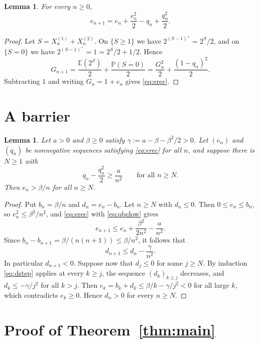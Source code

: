 \documentclass[11pt]{amsart}
\newtheorem{lemma}[theorem]{Lemma}
\theoremstyle{definition}
\theoremstyle{remark}
\numberwithin{equation}{section}
\newcommand{\Pp}{\mathbb P}
\newcommand{\E}{\mathbb E}
\begin{document}
\begin{lemma}\label{lem:rec}
For every $n\ge0$,
\begin{equation}\label{eq:erec}
e_{n+1}=e_n+\frac{e_n^2}{2}-q_n+\frac{q_n^2}{2}.
\end{equation}
\end{lemma}

\begin{proof}
Let $S=X_n^{(1)}+X_n^{(2)}$. On $\{S\ge1\}$ we have $2^{(S-1)^+}=2^{S}/2$, and on $\{S=0\}$ we have $2^{(S-1)^+}=1=2^S/2+1/2$. Hence
\[
G_{n+1}=\frac{\E(2^S)}2+\frac{\Pp(S=0)}2=\frac{G_n^2}{2}+\frac{(1-q_n)^2}{2}.
\]
Subtracting $1$ and writing $G_n=1+e_n$ gives \eqref{eq:erec}.
\end{proof}

\section{A barrier}\label{sec:barrier}

\begin{lemma}\label{lem:barrier}
Let $a>0$ and $\beta\ge0$ satisfy $\gamma:=a-\beta-\beta^2/2>0$. Let $(e_n)$ and $(q_n)$ be nonnegative sequences satisfying \eqref{eq:erec} for all $n$, and suppose there is $N\ge1$ with
\begin{equation}\label{eq:qbelow}
q_n-\frac{q_n^2}{2}\ge\frac{a}{n^2}\qquad\text{for all }n\ge N.
\end{equation}
Then $e_n>\beta/n$ for all $n\ge N$.
\end{lemma}

\begin{proof}
Put $b_n=\beta/n$ and $d_n=e_n-b_n$. Let $n\ge N$ with $d_n\le0$. Then $0\le e_n\le b_n$, so $e_n^2\le\beta^2/n^2$, and \eqref{eq:erec} with \eqref{eq:qbelow} gives
\[
e_{n+1}\le e_n+\frac{\beta^2}{2n^2}-\frac{a}{n^2}.
\]
Since $b_n-b_{n+1}=\beta/(n(n+1))\le\beta/n^2$, it follows that
\begin{equation}\label{eq:dstep}
d_{n+1}\le d_n-\frac{\gamma}{n^2}.
\end{equation}
In particular $d_{n+1}<0$. Suppose now that $d_j\le0$ for some $j\ge N$. By induction \eqref{eq:dstep} applies at every $k\ge j$, the sequence $(d_k)_{k\ge j}$ decreases, and $d_k\le-\gamma/j^2$ for all $k>j$. Then $e_k=b_k+d_k\le\beta/k-\gamma/j^2<0$ for all large $k$, which contradicts $e_k\ge0$. Hence $d_n>0$ for every $n\ge N$.
\end{proof}

\section{Proof of Theorem~\ref{thm:main}}\label{sec:proof}
\end{document}
